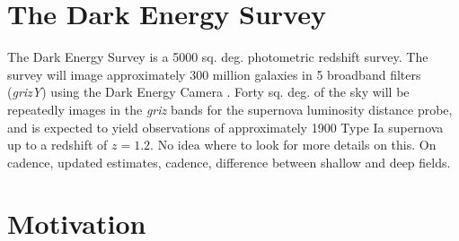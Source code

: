 \documentclass[a4paper,fleqn,usenatbib]{mnras}
\newcommand{\red}{\color{red}}
\begin{document}
\section{The Dark Energy Survey}
\label{sec:des}

The Dark Energy Survey \citep[DES,][]{des2005, des2016} is a 5000 sq. deg. photometric redshift survey. The survey will image approximately 300 million galaxies in 5 broadband filters (\textit{grizY}) using the Dark Energy Camera \citep[DECam,][]{FlaugherDiehl2015}. Forty sq. deg. of the sky will be repeatedly images in the \textit{griz} bands for the supernova luminosity distance probe, and is expected to yield observations of approximately 1900 Type Ia supernova up to a redshift of $z=1.2$. {\red No idea where to look for more details on this. On cadence, updated estimates, cadence, difference between shallow and deep fields.}








\section{Motivation}
\label{sec:motivation}
\end{document}
